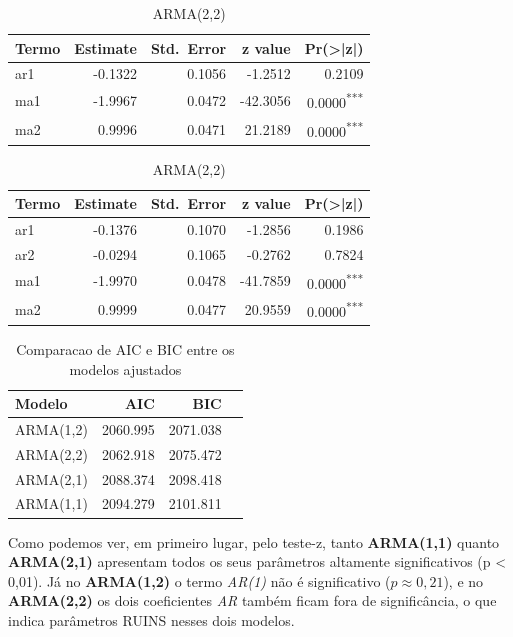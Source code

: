 \documentclass[
]{article}
\begin{document}
\begin{table}[!ht]
  \begin{subtable}[t]{0.45\textwidth}
    \centering
    \caption{ARMA(1,2)}
    \begin{tabular}{lrrrr}
      \toprule
      Termo & Estimate & Std.\ Error & z value & Pr(>|z|)\\
      \midrule
      ar1 & -0.1322 & 0.1056 & -1.2512 & 0.2109\\
      ma1 & -1.9967 & 0.0472 & -42.3056 & 0.0000\textsuperscript{***}\\
      ma2 &  0.9996 & 0.0471 & 21.2189 & 0.0000\textsuperscript{***}\\
      \bottomrule
    \end{tabular}
  \end{subtable}%
  \hfill
  \begin{subtable}[t]{0.45\textwidth}
    \centering
    \caption{ARMA(2,2)}
    \begin{tabular}{lrrrr}
      \toprule
      Termo & Estimate & Std.\ Error & z value & Pr(>|z|)\\
      \midrule
      ar1 & -0.1376 & 0.1070 & -1.2856 & 0.1986\\
      ar2 & -0.0294 & 0.1065 & -0.2762 & 0.7824\\
      ma1 & -1.9970 & 0.0478 & -41.7859 & 0.0000\textsuperscript{***}\\
      ma2 &  0.9999 & 0.0477 & 20.9559 & 0.0000\textsuperscript{***}\\
      \bottomrule
    \end{tabular}
  \end{subtable}
\end{table}

\begin{table}[!h]
  \centering
  \caption{Comparacao de AIC e BIC entre os modelos ajustados}
  \label{tab:criterios_arma}
  \begin{tabular}{lrrr}
    \toprule
    Modelo    &     AIC    &     BIC    \\
    \midrule
    ARMA(1,2) & 2060.995 & 2071.038 \\
    ARMA(2,2) & 2062.918 & 2075.472 \\
    ARMA(2,1) & 2088.374 & 2098.418 \\
    ARMA(1,1) & 2094.279 & 2101.811 \\
    \bottomrule
  \end{tabular}
\end{table}

Como podemos ver, em primeiro lugar, pelo teste-z, tanto
\textbf{ARMA(1,1)} quanto \textbf{ARMA(2,1)} apresentam todos os seus
parâmetros altamente significativos (p \textless{} 0,01). Já no
\textbf{ARMA(1,2)} o termo \emph{AR(1)} não é significativo
(\(p \approx 0{,}21\)), e no \textbf{ARMA(2,2)} os dois coeficientes
\emph{AR} também ficam fora de significância, o que indica parâmetros
RUINS nesses dois modelos.
\end{document}
